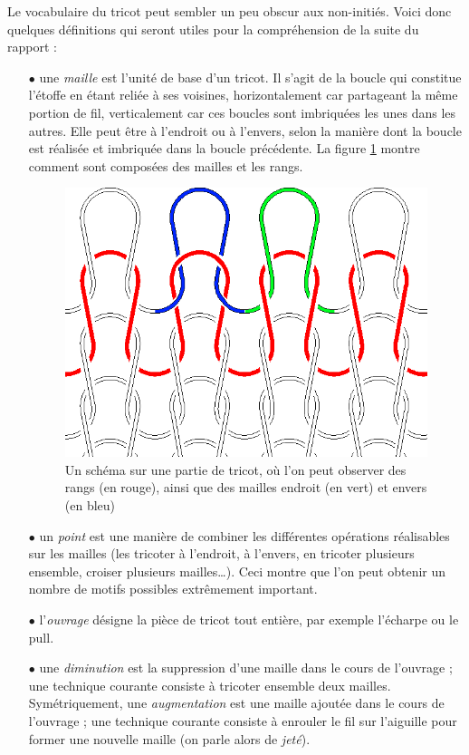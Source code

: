 \documentclass{article}
\begin{document}
Le vocabulaire du tricot peut sembler un peu obscur aux non-initiés.
Voici donc quelques définitions qui seront utiles pour la compréhension
de la suite du rapport :

\begin{itemize}
\item[$\bullet$] une \emph{maille} est l'unité de base d'un tricot. Il s'agit de
  la boucle qui constitue l'étoffe en étant reliée à ses voisines,
  horizontalement car partageant la même portion de fil, verticalement
  car ces boucles sont imbriquées les unes dans les autres. Elle peut
  être à l'endroit ou à l'envers, selon la manière dont la boucle est
  réalisée et imbriquée dans la boucle précédente. La figure \ref{maille} 
  montre comment sont composées des mailles et les rangs.

\begin{figure}[!ht]
  \centering \includegraphics[scale=0.25]{../presentation/Knit-schematic2.png}
  \caption{Un schéma sur une partie de tricot, où l'on peut observer des rangs 
  (en rouge), ainsi que des mailles endroit (en vert) et envers (en bleu)}
  \label{maille}
\end{figure}

\item[$\bullet$] un \emph{point} est une manière de combiner les différentes
  opérations réalisables sur les mailles (les tricoter à l'endroit, à
  l'envers, en tricoter plusieurs ensemble, croiser plusieurs mailles\dots).
  Ceci montre que l'on peut obtenir un nombre de motifs possibles 
  extrêmement important.
\item[$\bullet$] l'\emph{ouvrage} désigne la pièce de tricot tout entière, par
  exemple l'écharpe ou le pull.
\item[$\bullet$] une \emph{diminution} est la suppression d'une maille dans le
  cours de l'ouvrage ; une technique courante consiste à tricoter
  ensemble deux mailles. Symétriquement, une \emph{augmentation} est
  une maille ajoutée dans le cours de l'ouvrage ; une technique
  courante consiste à enrouler le fil sur l'aiguille pour former une
  nouvelle maille (on parle alors de \emph{jeté}).
\end{itemize}
\end{document}

